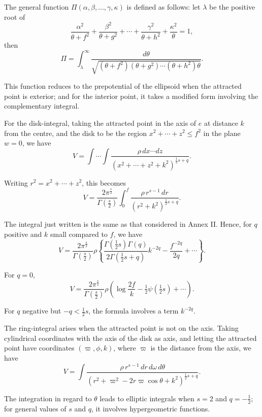 \documentclass[11pt,a4paper]{book}
\begin{document}
\begin{art}\label{art:71}
The general function $\Pi(\alpha, \beta, \ldots, \gamma, \kappa)$ is defined as follows: let $\lambda$ be the positive root of
\[
\frac{\alpha^2}{\theta + f^2} + \frac{\beta^2}{\theta + g^2} + \cdots + \frac{\gamma^2}{\theta + h^2} + \frac{\kappa^2}{\theta} = 1,
\]
then
\[
\Pi = \int_\lambda^\infty \frac{d\theta}{\sqrt{(\theta + f^2)(\theta + g^2) \cdots (\theta + h^2)\theta}}.
\]

This function reduces to the prepotential of the ellipsoid when the attracted point is exterior; and for the interior point, it takes a modified form involving the complementary integral.
\end{art}

\begin{art}\label{art:72}
For the disk-integral, taking the attracted point in the axis of $e$ at distance $k$ from the centre, and the disk to be the region $x^2 + \cdots + z^2 \leq f^2$ in the plane $w = 0$, we have
\[
V = \int \cdots \int \frac{\rho \, dx \cdots dz}{(x^2 + \cdots + z^2 + k^2)^{\frac{1}{2}s+q}}.
\]

Writing $r^2 = x^2 + \cdots + z^2$, this becomes
\[
V = \frac{2\pi^{\frac{s}{2}}}{\Gamma(\frac{s}{2})} \int_0^f \frac{\rho \, r^{s-1} \, dr}{(r^2 + k^2)^{\frac{1}{2}s+q}}.
\]
\end{art}

\begin{art}\label{art:73}
The integral just written is the same as that considered in Annex II. Hence, for $q$ positive and $k$ small compared to $f$, we have
\[
V = \frac{2\pi^{\frac{s}{2}}}{\Gamma(\frac{s}{2})} \rho \left\{ \frac{\Gamma(\frac{1}{2}s)\Gamma(q)}{2\Gamma(\frac{1}{2}s+q)} k^{-2q} - \frac{f^{-2q}}{2q} + \cdots \right\}.
\]

For $q = 0$,
\[
V = \frac{2\pi^{\frac{s}{2}}}{\Gamma(\frac{s}{2})} \rho \left(\log\frac{2f}{k} - \tfrac{1}{2}\psi(\tfrac{1}{2}s) + \cdots \right).
\]

For $q$ negative but $-q < \frac{1}{2}s$, the formula involves a term $k^{-2q}$.
\end{art}

\begin{art}\label{art:74}
The ring-integral arises when the attracted point is not on the axis. Taking cylindrical coordinates with the axis of the disk as axis, and letting the attracted point have coordinates $(\varpi, \phi, k)$, where $\varpi$ is the distance from the axis, we have
\[
V = \int \frac{\rho \, r^{s-1} \, dr \, d\omega \, d\theta}{(r^2 + \varpi^2 - 2r\varpi\cos\theta + k^2)^{\frac{1}{2}s+q}}.
\]

The integration in regard to $\theta$ leads to elliptic integrals when $s = 2$ and $q = -\tfrac{1}{2}$; for general values of $s$ and $q$, it involves hypergeometric functions.
\end{art}
\end{document}
